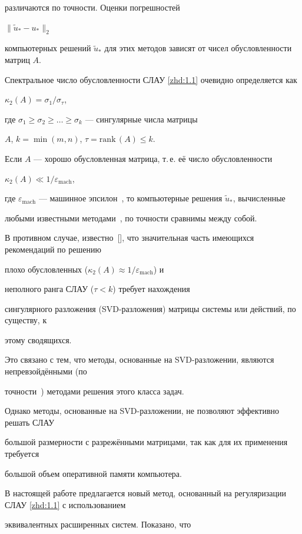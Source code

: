 различаются по точности. Оценки погрешностей

$\|\tilde u_*-u_*\|_2$

компьютерных решений $\tilde u_*$ для этих методов зависят от чисел обусловленности матриц $A$.

Спектральное число обусловленности СЛАУ \eqref{zhd:1.1} очевидно определяется как

$\kappa_2(A)=\sigma_1/\sigma_\tau$,

где $\sigma_1\geq\sigma_2\geq\dots\geq\sigma_k$ --- сингулярные числа матрицы

$A$, $k=\min(m, n)$, \mbox{$\tau=\mathrm{rank}\,(A)\leq k$}.



Если $A$ --- хорошо обусловленная матрица, т.\,е. её число обусловленности

$ \kappa_2(A)\ll 1/\varepsilon_\mathrm{mach} $,

где $\varepsilon_\mathrm{mach}$ --- машинное эпсилон~\cite{zhdanov:Bekl}, то компьютерные решения $\tilde u_*$, вычисленные

любыми известными методами~\cite{zhdanov:Bekl}, по точности сравнимы между собой.

В противном случае, известно~[], что значительная часть имеющихся рекомендаций по решению

плохо обусловленных ($\kappa_2(A)\approx 1/\varepsilon_\mathrm{mach}$) и

неполного ранга СЛАУ ($\tau<k$) требует нахождения

сингулярного разложения (SVD-разложения) матрицы системы или действий, по существу, к

этому сводящихся.

Это связано с тем, что методы, основанные на SVD-разложении, являются непревзойдёнными (по

точности~\cite{zhdanov:Dem}) методами решения этого класса задач.

Однако методы, основанные на SVD-разложении, не позволяют эффективно решать СЛАУ

большой размерности с разрежёнными матрицами, так как для их применения требуется

большой объем оперативной памяти компьютера.



В настоящей работе предлагается новый метод, основанный на регуляризации СЛАУ \eqref{zhd:1.1} с использованием

эквивалентных расширенных систем. Показано, что

